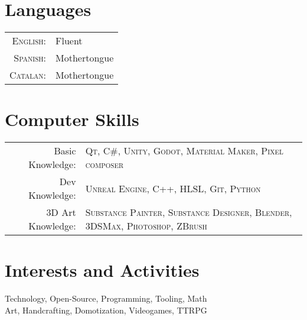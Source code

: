 \documentclass[a4paper,10pt]{article} %
\begin{document}

\section{Languages}

\begin{tabular}{rl}
\textsc{English:} & Fluent\\

\textsc{Spanish:} & Mothertongue\\

\textsc{Catalan:} & Mothertongue\\
\end{tabular}


\section{Computer Skills}

\begin{tabular}{rl}
Basic Knowledge: & \textsc{Qt}, \textsc{C\#}, \textsc{Unity}, \textsc{Godot}, \textsc{Material Maker}, \textsc{Pixel composer}\\

Dev Knowledge: & \textsc{Unreal Engine}, \textsc{C++}, \textsc{HLSL}, \textsc{Git}, \textsc{Python}\\
3D Art Knowledge: & \textsc{Substance Painter}, \textsc{Substance Designer}, \textsc{Blender}, \textsc{3DSMax}, \textsc{Photoshop}, \textsc{ZBrush}\\
\end{tabular}


\section{Interests and Activities}

Technology, Open-Source, Programming, Tooling, Math\\
Art, Handcrafting, Domotization, Videogames, TTRPG
\end{document}
